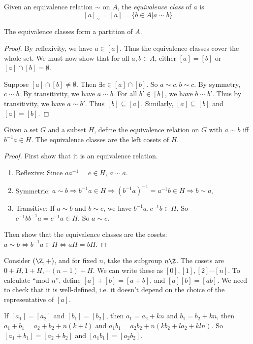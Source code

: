 \documentclass[a4paper]{article}
\begin{document}
  \begin{defi}
    Given an equivalence relation $\sim$ on $A$, the \emph{equivalence class} of $a$ is
    \[
      [a]_{\sim} = [a] = \{b\in A|a\sim b\}
    \]
  \end{defi}

  \begin{prop}
    The equivalence classes form a partition of $A$.
  \end{prop}

  \begin{proof}
    By reflexivity, we have $a\in [a]$. Thus the equivalence classes cover the whole set. We must now show that for all $a, b\in A$, either $[a] = [b]$ or $[a]\cap [b]=\emptyset$.

    Suppose $[a]\cap[b]\not=\emptyset$. Then $\exists c\in [a]\cap[b]$. So $a\sim c, b\sim c$. By symmetry, $c\sim b$. By transitivity, we have $a\sim b$. For all $b'\in [b]$, we have $b\sim b'$. Thus by transitivity, we have $a\sim b'$. Thus $[b]\subseteq[a]$. Similarly, $[a]\subseteq[b]$  and $[a] = [b]$.
  \end{proof}

  \begin{lemma}
    Given a set $G$ and a subset $H$, define the equivalence relation on $G$ with $a\sim b$ iff $b^{-1}a\in H$. The equivalence classes are the left cosets of $H$.
  \end{lemma}

  \begin{proof}
    First show that it is an equivalence relation.
    \begin{enumerate}
      \item Reflexive: Since $aa^{-1} = e\in H$,  $a\sim a$.
      \item Symmetric: $a\sim b\Rightarrow b^{-1}a\in H \Rightarrow (b^{-1}a)^{-1} = a^{-1}b\in H\Rightarrow b\sim a$.
      \item Transitive: If $a\sim b$ and $b\sim c$, we have $b^{-1}a, c^{-1}b\in H$. So $c^{-1}bb^{-1}a = c^{-1}a\in H$. So $a\sim c$.
    \end{enumerate}
    Then show that the equivalence classes are the cosets: $a\sim b\Leftrightarrow b^{-1}a\in H \Leftrightarrow aH = bH$.
  \end{proof}

  \begin{eg}
    Consider $(\Z, +)$, and for fixed $n$, take the subgroup $n\Z$. The cosets are $0+ H, 1 + H, \cdots (n - 1)+H$. We can write these as $[0], [1], [2] \cdots [n]$. To calculate ``mod $n$'', define $[a] + [b] = [a + b]$, and $[a][b] = [ab]$. We need to check that it is well-defined, i.e. it doesn't depend on the choice of the representative of $[a]$.

    If $[a_1] = [a_2]$ and $[b_1] = [b_2]$, then $a_1 = a_2 + kn$ and $b_1 = b_2 + kn$, then $a_1 + b_1 = a_2 + b_2 + n(k + l)$ and $a_1b_1 = a_2b_2 + n(kb_2 +la_2 + kln)$. So $[a_1 + b_1] = [a_2 + b_2]$ and $[a_1b_1] = [a_2b_2]$.
  \end{eg}
\end{document}
